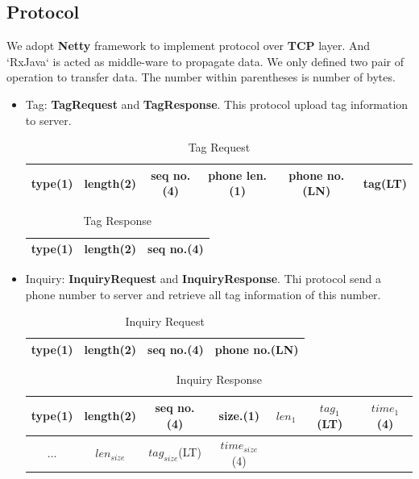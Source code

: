 \documentclass{article}
\begin{document}
\subsection{Protocol}
We adopt \textbf{Netty} \cite{netty} framework to implement protocol over \textbf{TCP} layer. And `RxJava` is acted as middle-ware to propagate data. We only defined two pair of operation to transfer data. The number within parentheses is number of bytes.

\begin{itemize}
    
    \item Tag: \textbf{TagRequest} and \textbf{TagResponse}. This protocol upload tag information to server.

    \begin{table}[H]
        \centering
        \begin{tabular}{|c|c|c|c|c|c|}
        \hline
        type(1) & length(2) & seq no.(4) & phone len.(1) & phone no.(LN) & tag(LT)\\
        \hline
        \end{tabular}
        \caption{Tag Request}
    \end{table} 

    \begin{table}[H]
        \centering
        \begin{tabular}{|c|c|c|}
        \hline
        type(1) & length(2) & seq no.(4)\\
        \hline
        \end{tabular}
        \caption{Tag Response}
    \end{table} 

    \item Inquiry: \textbf{InquiryRequest} and \textbf{InquiryResponse}. Thi protocol send a phone number to server and retrieve all tag information of this number.

    \begin{table}[H]
        \centering
        \begin{tabular}{|c|c|c|c|}
        \hline
        type(1) & length(2) & seq no.(4) & phone no.(LN)\\
        \hline
        \end{tabular}
        \caption{Inquiry Request}
    \end{table} 

    \begin{table}[H]
        \centering
        \begin{tabular}{|c|c|c|c|c|c|c|}
        \hline
        type(1) & length(2) & seq no.(4) & size.(1) & $len_1$ & $tag_1$(LT) & $time_1$(4)  \\
        \hline
         ... & $len_{size}$ & $tag_{size}$(LT) & $time_{size}$(4) & & &\\
        \hline
        \end{tabular}
        \caption{Inquiry Response}
    \end{table} 

\end{itemize}
\end{document}
